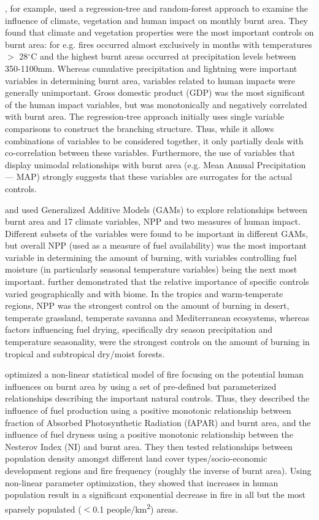 \documentclass[12pt]{article}
\begin{document}
\citet{aldersley2011global}, for example, used a regression-tree and random-forest approach to examine the influence of climate, vegetation and human impact on monthly burnt area. They found that climate and vegetation properties were the most important controls on burnt area: for e.g. fires occurred almost exclusively in months with temperatures $>$ 28$^{\circ}$C and the highest burnt areas occurred at precipitation levels between 350-1100mm. Whereas cumulative precipitation and lightning were important variables in determining burnt area, variables related to human impacts were generally unimportant. Gross domestic product (GDP) was the most significant of the human impact variables, but was monotonically and negatively correlated with burnt area. The regression-tree approach initially uses single variable comparisons to construct the branching structure. Thus, while it allows combinations of variables to be considered together, it only partially deals with co-correlation between these variables. Furthermore, the use of variables that display unimodal relationships with burnt area (e.g. Mean Annual Precipitation --- MAP) strongly suggests that these variables are surrogates for the actual controls.

\citet{krawchuk2009global} and \citet{moritz2012climate} used Generalized Additive Models (GAMs) to explore relationships between burnt area and 17 climate variables, NPP and two measures of human impact. Different subsets of the variables were found to be important in different GAMs, but overall NPP (used as a measure of fuel availability) was the most important variable in determining the amount of burning, with variables controlling fuel moisture (in particularly seasonal temperature variables) being the next most important. \citet{moritz2012climate} further demonstrated that the relative importance of specific controls varied geographically and with biome. In the tropics and warm-temperate regions, NPP was the strongest control on the amount of burning in desert, temperate grassland, temperate savanna and Mediterranean ecosystems, whereas factors influencing fuel drying, specifically dry season precipitation and temperature seasonality, were the strongest controls on the amount of burning in tropical and subtropical dry/moist forests.

\citet{knorr2014impact} optimized a non-linear statistical model of fire focusing on the potential human influences on burnt area by using a set of pre-defined but parameterized relationships describing the important natural controls. Thus, they described the influence of fuel production using a positive monotonic relationship between fraction of Absorbed Photosynthetic Radiation (fAPAR) and burnt area, and the influence of fuel dryness using a positive monotonic relationship between the Nesterov Index (NI) and burnt area. They then tested relationships between population density amongst different land cover types/socio-economic development regions and fire frequency (roughly the inverse of burnt area). Using non-linear parameter optimization, they showed that increases in human population result in a significant exponential decrease in fire in all but the most sparsely populated ($<$0.1 people/km\textsuperscript{2}) areas.
\end{document}
